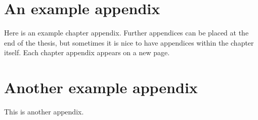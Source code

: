 \begin{chapappendices}

\section{An example appendix}
\label{sec:exampleAppendixI}
Here is an example chapter appendix. Further appendices can be placed at the end of the thesis, but sometimes it is nice to have appendices within the chapter itself. Each chapter appendix appears on a new page.

\section{Another example appendix}
\label{sec:exampleAppendixII}
This is another appendix.

\end{chapappendices}

